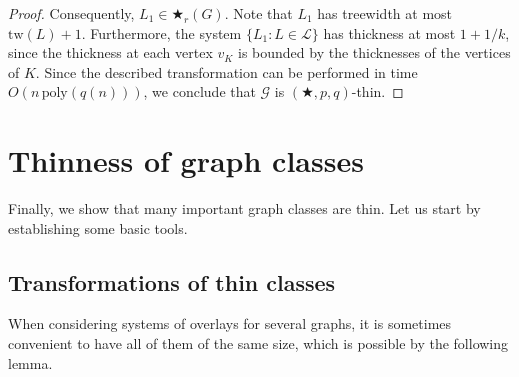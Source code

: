 \documentclass[a4paper,11pt]{article}
\newcommand{\GG}{{\mathcal G}}
\newcommand{\LL}{{\mathcal L}}
\newcommand{\poly}{\text{poly}}
\newcommand{\tw}{\text{tw}}
\begin{document}
\begin{proof}
Consequently, $L_1\in \bigstar_r(G)$.  Note that $L_1$ has treewidth at most $\tw(L)+1$.  Furthermore, the system $\{L_1:L\in\LL\}$ has thickness at most $1+1/k$,
since the thickness at each vertex $v_K$ is bounded by the thicknesses of the vertices of $K$.
Since the described transformation can be performed in time $O(n\,\poly(q(n)))$, we conclude that $\GG$ is $(\bigstar,p,q)$-thin.
\end{proof}

\section{Thinness of graph classes}\label{sec-classes}

Finally, we show that many important graph classes are thin.  Let us start by establishing
some basic tools.

\subsection{Transformations of thin classes}
When considering systems of overlays for several graphs, it is sometimes convenient to have all of them of the same
size, which is possible by the following lemma.
\end{document}
